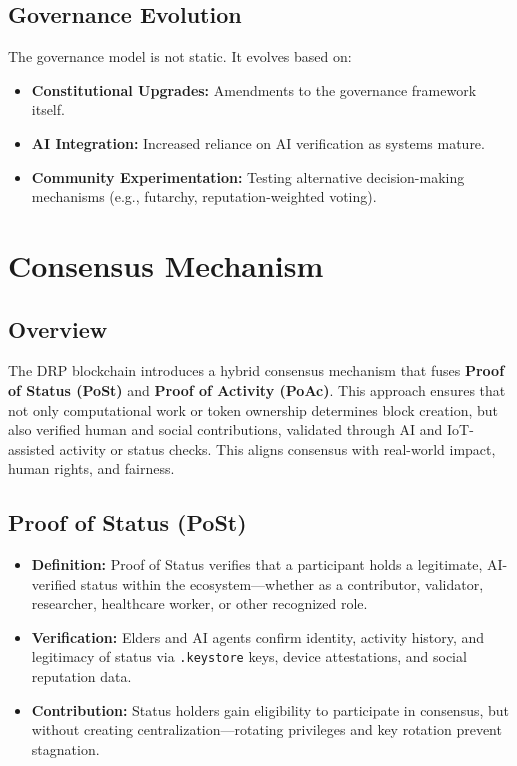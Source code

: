 \documentclass[11pt,a4paper]{article}
\begin{document}
\subsection{Governance Evolution}
The governance model is not static. It evolves based on:
\begin{itemize}
    \item \textbf{Constitutional Upgrades:} Amendments to the governance framework itself.
    \item \textbf{AI Integration:} Increased reliance on AI verification as systems mature.
    \item \textbf{Community Experimentation:} Testing alternative decision-making mechanisms (e.g., futarchy, reputation-weighted voting).
\end{itemize}

\section{Consensus Mechanism}

\subsection{Overview}
The DRP blockchain introduces a hybrid consensus mechanism that fuses \textbf{Proof of Status (PoSt)} and \textbf{Proof of Activity (PoAc)}. This approach ensures that not only computational work or token ownership determines block creation, but also verified human and social contributions, validated through AI and IoT-assisted activity or status checks. This aligns consensus with real-world impact, human rights, and fairness.

\subsection{Proof of Status (PoSt)}
\begin{itemize}
    \item \textbf{Definition:} Proof of Status verifies that a participant holds a legitimate, AI-verified status within the ecosystem—whether as a contributor, validator, researcher, healthcare worker, or other recognized role.
    \item \textbf{Verification:} Elders and AI agents confirm identity, activity history, and legitimacy of status via \texttt{.keystore} keys, device attestations, and social reputation data.
    \item \textbf{Contribution:} Status holders gain eligibility to participate in consensus, but without creating centralization—rotating privileges and key rotation prevent stagnation.
\end{itemize}
\end{document}
